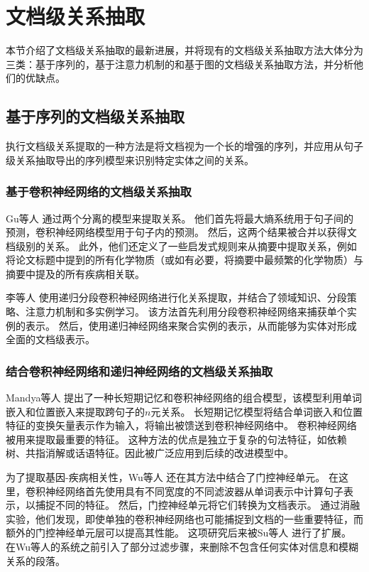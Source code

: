 \documentclass[bachelor]{thesis-uestc}
\begin{document}
\section{文档级关系抽取}
本节介绍了文档级关系抽取的最新进展，并将现有的文档级关系抽取方法大体分为三类：基于序列的，基于注意力机制的和基于图的文档级关系抽取方法，并分析他们的优缺点。

\subsection{基于序列的文档级关系抽取}
执行文档级关系提取的一种方法是将文档视为一个长的增强的序列，并应用从句子级关系抽取导出的序列模型来识别特定实体之间的关系。

\subsubsection{基于卷积神经网络的文档级关系抽取}
Gu等人 \cite{10.1093/database/bax024}通过两个分离的模型来提取关系。
他们首先将最大熵系统用于句子间的预测，卷积神经网络模型用于句子内的预测。
然后，这两个结果被合并以获得文档级别的关系。
此外，他们还定义了一些启发式规则来从摘要中提取关系，例如将论文标题中提到的所有化学物质（或如有必要，将摘要中最频繁的化学物质）与摘要中提及的所有疾病相关联。\par

李等人 \cite{li2018chemical}
使用递归分段卷积神经网络进行化关系提取，并结合了领域知识、分段策略、注意力机制和多实例学习。
该方法首先利用分段卷积神经网络来捕获单个实例的表示。
然后，使用递归神经网络来聚合实例的表示，从而能够为实体对形成全面的文档级表示。

\subsubsection{结合卷积神经网络和递归神经网络的文档级关系抽取}
Mandya等人 \cite{mandya2018combining}提出了一种长短期记忆和卷积神经网络的组合模型，该模型利用单词嵌入和位置嵌入来提取跨句子的$n$元关系。
长短期记忆模型将结合单词嵌入和位置特征的变换矢量表示作为输入，将输出被馈送到卷积神经网络中。
卷积神经网络被用来提取最重要的特征。
这种方法的优点是独立于复杂的句法特征，如依赖树、共指消解或话语特征。因此被广泛应用到后续的改进模型中。

为了提取基因-疾病相关性，Wu等人 \cite{GDA}还在其方法中结合了门控神经单元。
在这里，卷积神经网络首先使用具有不同宽度的不同滤波器从单词表示中计算句子表示，以捕捉不同的特征。
然后，门控神经单元将它们转换为文档表示。
通过消融实验，他们发现，即使单独的卷积神经网络也可能捕捉到文档的一些重要特征，而额外的门控神经单元层可以提高其性能。
这项研究后来被Su等人 \cite{renet2} 进行了扩展。
在Wu等人的系统之前引入了部分过滤步骤，来删除不包含任何实体对信息和模糊关系的段落。
\end{document}
